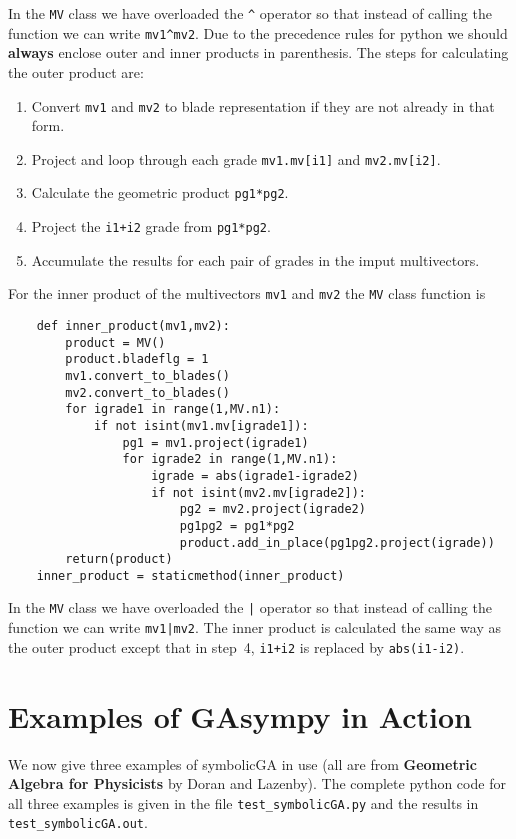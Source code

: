 \documentclass{article}
\begin{document}
In the 
{\tt MV} class we have overloaded the {\tt \verb!^!} operator so that instead of calling the function we
can write {\tt mv1\verb!^!mv2}.  Due to the precedence rules for python we should {\bf always} enclose outer
and inner products in parenthesis.  The steps for calculating the outer product are:
\begin{enumerate}
\item Convert {\tt mv1} and {\tt mv2} to blade representation if they are not already in that form.
\item Project and loop through each grade {\tt mv1.mv[i1]} and {\tt mv2.mv[i2]}.
\item Calculate the geometric product {\tt pg1*pg2}.
\item Project the {\tt i1+i2} grade from {\tt pg1*pg2}.
\item Accumulate the results for each pair of grades in the imput multivectors.
\end{enumerate}
For the inner product of the multivectors {\tt mv1} and {\tt mv2} the {\tt MV} class function is 

\begin{verbatim}
    def inner_product(mv1,mv2):
        product = MV()
        product.bladeflg = 1
        mv1.convert_to_blades()
        mv2.convert_to_blades()
        for igrade1 in range(1,MV.n1):
            if not isint(mv1.mv[igrade1]):
                pg1 = mv1.project(igrade1)
                for igrade2 in range(1,MV.n1):
                    igrade = abs(igrade1-igrade2)
                    if not isint(mv2.mv[igrade2]):
                        pg2 = mv2.project(igrade2)
                        pg1pg2 = pg1*pg2
                        product.add_in_place(pg1pg2.project(igrade))
        return(product)
    inner_product = staticmethod(inner_product)  
\end{verbatim}

In the {\tt MV} class we have overloaded the {\tt |} operator so that instead 
of calling the function we can write {\tt mv1|mv2}. The inner product is calculated the same way 
as the outer product except that in step~4, {\tt i1+i2} is replaced by {\tt abs(i1-i2)}.

\section{Examples of GAsympy in Action}

We now give three examples of symbolicGA in use (all are from {\bf Geometric Algebra for Physicists}
by Doran and Lazenby). The complete python code for all three examples is given in the file
{\tt test\_symbolicGA.py} and the results in {\tt test\_symbolicGA.out}.
\end{document}
